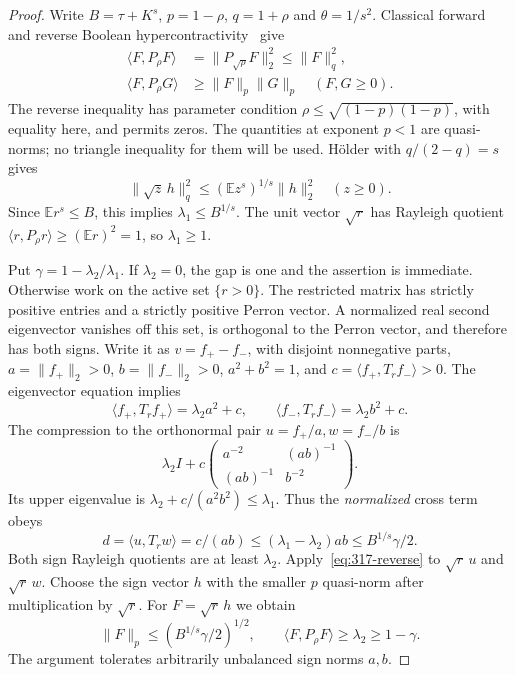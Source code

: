 \documentclass[11pt]{article}
\begin{document}
\begin{proof}
Write $B=\tau+K^s$, $p=1-\rho$, $q=1+\rho$ and
$\theta=1/s^2$. Classical forward and reverse Boolean
hypercontractivity~\cite[Theorem~3.1 and Corollary~3.3]{MORSS} give
\begin{align}
 \langle F,P_\rho F\rangle
   &=\|P_{\sqrt\rho}F\|_2^2\le\|F\|_q^2,\label{eq:317-forward}\\
 \langle F,P_\rho G\rangle&\ge\|F\|_p\|G\|_p
                 \quad(F,G\ge0).\label{eq:317-reverse}
\end{align}
The reverse inequality has parameter condition
$\rho\le\sqrt{(1-p)(1-p)}$, with equality here, and permits zeros.
The quantities at exponent $p<1$ are quasi-norms; no triangle inequality
for them will be used. H\"older with $q/(2-q)=s$ gives
\[
 \|\sqrt z\,h\|_q^2\le(\mathbb Ez^s)^{1/s}\|h\|_2^2
 \quad(z\ge0).
\]
Since $\mathbb Er^s\le B$, this implies $\lambda_1\le B^{1/s}$.
The unit vector $\sqrt r$ has Rayleigh quotient
$\langle r,P_\rho r\rangle\ge(\mathbb Er)^2=1$, so
$\lambda_1\ge1$.

Put $\gamma=1-\lambda_2/\lambda_1$. If $\lambda_2=0$, the gap is one
and the assertion is immediate. Otherwise work on the active set
$\{r>0\}$. The restricted matrix has strictly positive entries and a
strictly positive Perron vector. A normalized real second eigenvector
vanishes off this set, is orthogonal to the Perron vector, and therefore
has both signs. Write it as $v=f_+-f_-$, with disjoint nonnegative parts,
$a=\|f_+\|_2>0$, $b=\|f_-\|_2>0$, $a^2+b^2=1$, and
$c=\langle f_+,T_rf_-\rangle>0$. The eigenvector equation implies
\[
 \langle f_+,T_rf_+\rangle=\lambda_2a^2+c,\qquad
 \langle f_-,T_rf_-\rangle=\lambda_2b^2+c.
\]
The compression to the orthonormal pair $u=f_+/a,w=f_-/b$ is
\[
 \lambda_2I+c\begin{pmatrix}a^{-2}&(ab)^{-1}\\(ab)^{-1}&b^{-2}\end{pmatrix}.
\]
Its upper eigenvalue is $\lambda_2+c/(a^2b^2)\le\lambda_1$.
Thus the \emph{normalized} cross term obeys
\[
 d=\langle u,T_rw\rangle=c/(ab)
       \le(\lambda_1-\lambda_2)ab\le B^{1/s}\gamma/2.
\]
Both sign Rayleigh quotients are at least $\lambda_2$.
Apply~\eqref{eq:317-reverse} to $\sqrt r\,u$ and $\sqrt r\,w$.
Choose the sign vector $h$ with the smaller $p$ quasi-norm after
multiplication by $\sqrt r$. For $F=\sqrt r\,h$ we obtain
\begin{equation}\label{eq:317-sign}
 \|F\|_p\le(B^{1/s}\gamma/2)^{1/2},\qquad
 \langle F,P_\rho F\rangle\ge\lambda_2\ge1-\gamma.
\end{equation}
The argument tolerates arbitrarily unbalanced sign norms $a,b$.


\end{proof}
\end{document}
